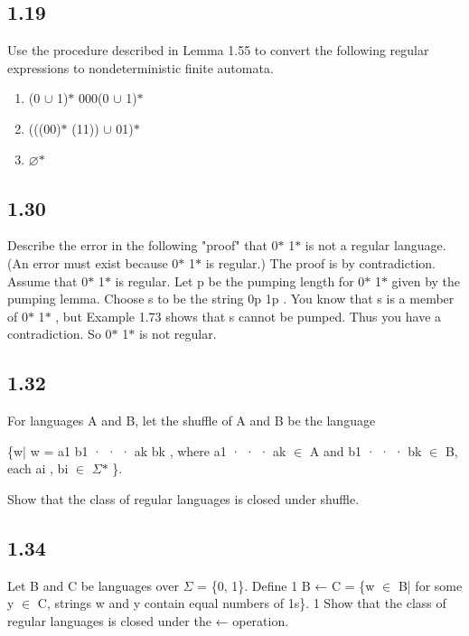 \subsection*{1.19}

Use the procedure described in Lemma 1.55 to convert the following regular expressions to nondeterministic finite automata.

\begin{enumerate}[label=(\alph*), leftmargin=2.5em]

\item (0 $\cup$ 1)$\ast$ 000(0 $\cup$ 1)$\ast$

\item (((00)$\ast$ (11)) $\cup$ 01)$\ast$

\item $\varnothing$$\ast$

\end{enumerate}


\subsection*{1.30}

Describe the error in the following "proof" that 0$\ast$ 1$\ast$ is not a regular language. (An error must exist because 0$\ast$ 1$\ast$ is regular.) The proof is by contradiction. Assume that 0$\ast$ 1$\ast$ is regular. Let p be the pumping length for 0$\ast$ 1$\ast$ given by the pumping lemma. Choose s to be the string 0p 1p . You know that s is a member of 0$\ast$ 1$\ast$ , but Example 1.73 shows that s cannot be pumped. Thus you have a contradiction. So 0$\ast$ 1$\ast$ is not regular.


\subsection*{1.32}

For languages A and B, let the shuffle of A and B be the language

\{w| w = a1 b1 · · · ak bk , where a1 · · · ak $\in$ A and b1 · · · bk $\in$ B, each ai , bi $\in$ $\Sigma$$\ast$ \}.

Show that the class of regular languages is closed under shuffle.


\subsection*{1.34}

Let B and C be languages over $\Sigma$ = \{0, 1\}. Define 1 B ← C = \{w $\in$ B| for some y $\in$ C, strings w and y contain equal numbers of 1s\}. 1 Show that the class of regular languages is closed under the ← operation.


